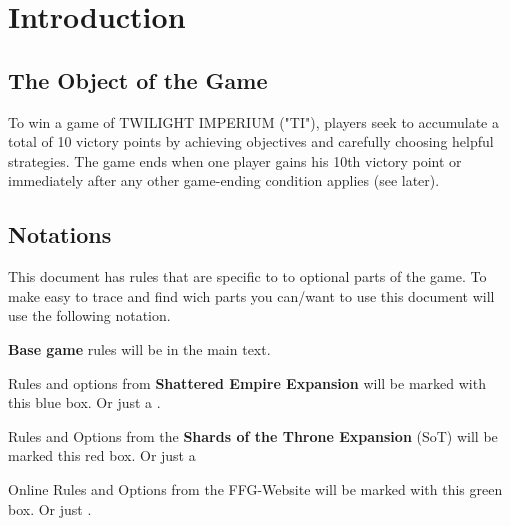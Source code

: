 \documentclass[11pt,fleqn]{book} %
\begin{document}
\tableofcontents %


\pagestyle{fancy} %


\chapter{Introduction}

\section{The Object of the Game}
To win a game of TWILIGHT IMPERIUM ("TI"), players seek to accumulate a total of 10 victory points by achieving objectives and carefully choosing helpful strategies. The game ends when one player gains his 10th victory point or immediately after any other game-ending condition applies (see later).

\section{Notations}

This document has rules that are specific to to optional parts of the game. To make easy to trace and find wich parts you can/want to use this document will use the following notation.

\textbf{Base game} rules will be in the main text.

\begin{SEbox}
Rules and options from \textbf{Shattered Empire Expansion} will be marked with this blue box.
Or just a .
\end{SEbox}


\begin{STbox}
Rules and Options from the \textbf{Shards of the Throne Expansion} (SoT) will be marked this red box. 
Or just a 
\end{STbox}

\begin{FFGbox}
Online Rules and Options from the FFG-Website will be marked with this green box. 
Or just .
\end{FFGbox}
\end{document}

